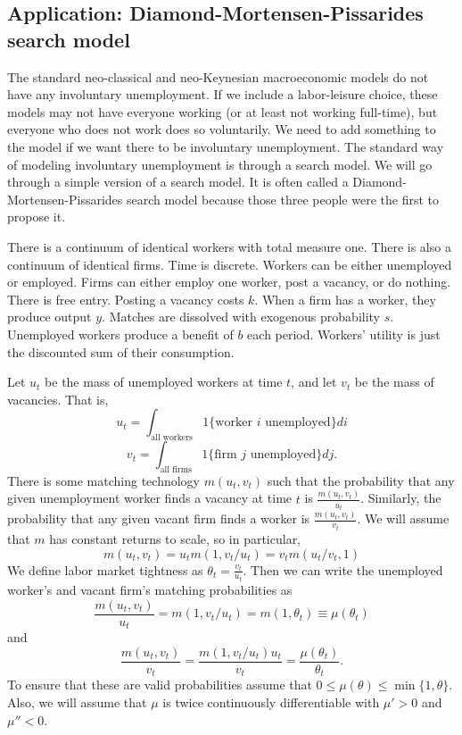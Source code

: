 \documentclass[12pt,reqno]{amsart}
\theoremstyle{definition}
\newtheorem{example}{Example}[section]
\begin{document}
  

\subsection{Application: Diamond-Mortensen-Pissarides search model}

The standard neo-classical and neo-Keynesian macroeconomic models do
not have any involuntary unemployment. If we include a labor-leisure
choice, these models may not have everyone working (or at least not
working full-time), but everyone who does not work does so
voluntarily. We need to add something to the model if we want there to
be involuntary unemployment. The standard way of modeling
involuntary unemployment is through a search model. We will go through
a simple version of a search model. It is often called a
Diamond-Mortensen-Pissarides search model because those three people
were the first to propose it. 

There is a continuum of identical workers with total measure
one. There is also a continuum of identical firms. Time is
discrete. Workers can be either unemployed or employed. Firms can
either employ one worker, post a vacancy, or do nothing. There is free
entry. Posting a vacancy costs $k$. When a firm has a worker, they
produce output $y$. Matches are dissolved with exogenous probability
$s$. Unemployed workers produce a benefit of $b$ each period. Workers'
utility is just the discounted sum of their consumption.

Let $u_t$ be the mass of unemployed workers at time $t$, and let $v_t$
be the mass of vacancies. That is,
\[ u_t = \int_{\text{all workers}} 1\{\text{worker $i$ unemployed}\} di \]
\[ v_t = \int_{\text{all firms}} 1\{\text{firm $j$ unemployed}\} dj. \]
There is some matching technology $m(u_t,v_t)$ such that the
probability that any given unemployment worker finds a vacancy at time
$t$ is $\frac{m(u_t,v_t)}{u_t}$. Similarly, the probability that any
given vacant firm finds a worker is $\frac{m(u_t,v_t)}{v_t}$. We will
assume that $m$ has constant returns to scale, so in particular,
\[ m(u_t,v_t) = u_t m(1,v_t/u_t) = v_t m(u_t/v_t,1) \]
We define labor market tightness as $\theta_t = \frac{v_t}{u_t}$. Then
we can write the unemployed worker's and vacant firm's matching
probabilities as 
\[ \frac{m(u_t,v_t)}{u_t} = m(1,v_t/u_t) = m(1,\theta_t) \equiv
\mu(\theta_t) \]
and 
\[ \frac{m(u_t,v_t)}{v_t} = \frac{m(1,v_t/u_t)u_t}{v_t} =
\frac{\mu(\theta_t)}{\theta_t}. \] 
To ensure that these are valid probabilities assume that $0 \leq \mu(\theta)
\leq \min\{1,\theta\}$. Also, we will assume that $\mu$ is twice
continuously differentiable with $\mu'>0$ and $\mu''<0$. 
\end{document}
